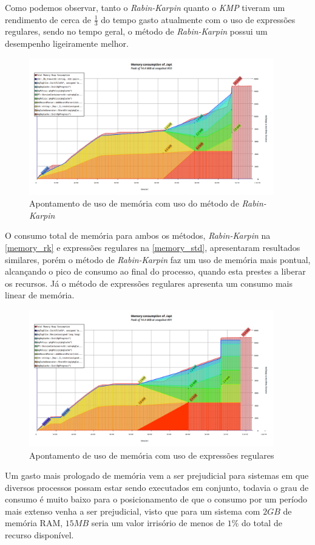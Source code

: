 Como podemos observar, tanto o \textit{Rabin-Karpin} quanto o \textit{KMP} tiveram um rendimento de cerca de $\frac{1}{3}$ do tempo gasto atualmente com o uso de expressões regulares, sendo no tempo geral, o método de \textit{Rabin-Karpin} possui um desempenho ligeiramente melhor.


\begin{figure}[htbp]
  \centering
  \includegraphics[width=0.95\textwidth]{figuras/memory_rk.png}
  \caption{Apontamento de uso de memória com uso do método de \textit{Rabin-Karpin}}
  \label{memory_rk}
\end{figure}

O consumo total de memória para ambos os métodos, \textit{Rabin-Karpin} na \autoref{memory_rk} e expressões regulares na \autoref{memory_std},  apresentaram resultados similares, porém o método de \textit{Rabin-Karpin} faz um uso de memória mais pontual, alcançando o pico de consumo ao final do processo, quando esta prestes a liberar os recursos. Já o método de expressões regulares apresenta um consumo mais linear de memória. 


\begin{figure}[htbp]
  \centering
  \includegraphics[width=0.95\textwidth]{figuras/memory_regex.png}
  \caption{Apontamento de uso de memória com uso de expressões regulares}
  \label{memory_std}
\end{figure}

Um gasto mais prologado de memória vem a ser prejudicial para sistemas em que diversos processos possam estar sendo executados em conjunto, todavia o grau de consumo é muito baixo para o posicionamento de que o consumo por um período mais extenso venha a ser prejudicial, visto que para um sistema com $2GB$ de memória RAM, $15MB$ seria um valor irrisório de menos de $1\%$ do total de recurso disponível.

